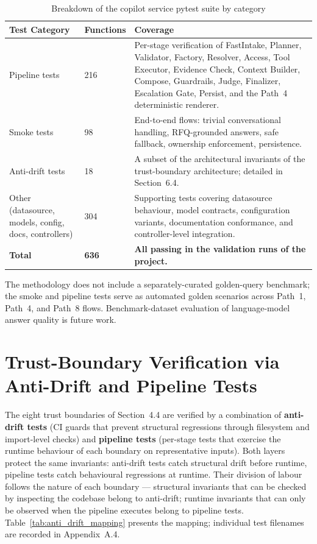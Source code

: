 \begin{table}[H]
\centering
\renewcommand{\arraystretch}{1.4}
\begin{tabularx}{\textwidth}{|p{4.5cm}|p{1.8cm}|>{\RaggedRight\arraybackslash}X|}
\hline
\rowcolor{lightgray}
\textbf{Test Category} & \textbf{Functions} & \textbf{Coverage} \\ \hline
Pipeline tests & 216 & Per-stage verification of FastIntake, Planner, Validator, Factory, Resolver, Access, Tool Executor, Evidence Check, Context Builder, Compose, Guardrails, Judge, Finalizer, Escalation Gate, Persist, and the Path~4 deterministic renderer. \\ \hline
Smoke tests & 98 & End-to-end flows: trivial conversational handling, RFQ-grounded answers, safe fallback, ownership enforcement, persistence. \\ \hline
Anti-drift tests & 18 & A subset of the architectural invariants of the trust-boundary architecture; detailed in Section~6.4. \\ \hline
Other (datasource, models, config, docs, controllers) & 304 & Supporting tests covering datasource behaviour, model contracts, configuration variants, documentation conformance, and controller-level integration. \\ \hline
\textbf{Total} & \textbf{636} & \textbf{All passing in the validation runs of the project.} \\ \hline
\end{tabularx}
\caption{Breakdown of the copilot service pytest suite by category}
\label{tab:copilot_tests}
\end{table}

The methodology does not include a separately-curated golden-query benchmark; the smoke and pipeline tests serve as automated golden scenarios across Path~1, Path~4, and Path~8 flows. Benchmark-dataset evaluation of language-model answer quality is future work.

\section{Trust-Boundary Verification via Anti-Drift and Pipeline Tests}
The eight trust boundaries of Section~4.4 are verified by a combination of \textbf{anti-drift tests} (CI guards that prevent structural regressions through filesystem and import-level checks) and \textbf{pipeline tests} (per-stage tests that exercise the runtime behaviour of each boundary on representative inputs). Both layers protect the same invariants: anti-drift tests catch structural drift before runtime, pipeline tests catch behavioural regressions at runtime. Their division of labour follows the nature of each boundary --- structural invariants that can be checked by inspecting the codebase belong to anti-drift; runtime invariants that can only be observed when the pipeline executes belong to pipeline tests. Table~\ref{tab:anti_drift_mapping} presents the mapping; individual test filenames are recorded in Appendix~A.4.

